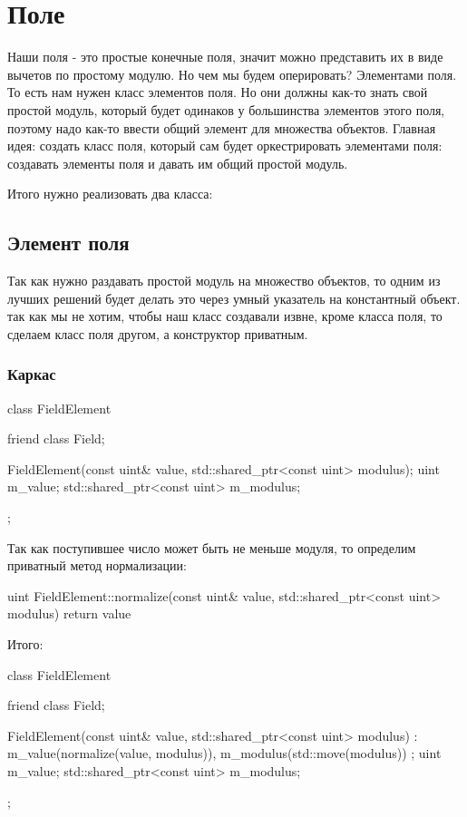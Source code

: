 
\section{Поле}
Наши поля - это простые конечные поля, значит можно представить их в виде вычетов по простому модулю. Но чем мы будем оперировать? Элементами поля. То есть нам нужен класс элементов поля. Но они должны как-то знать свой простой модуль, который будет одинаков у большинства элементов этого поля, поэтому надо как-то ввести общий элемент для множества объектов. Главная идея: создать класс поля, который сам будет оркестрировать элементами поля: создавать элементы поля и давать им общий простой модуль.

Итого нужно реализовать два класса:
\subsection{Элемент поля}
  Так как нужно раздавать простой модуль на множество объектов, то одним из лучших решений будет делать это через умный указатель на константный объект. так как мы не хотим, чтобы наш класс создавали извне, кроме класса поля, то сделаем класс поля другом, а конструктор приватным.
\subsubsection{Каркас}
  \begin{cppcode}
class FieldElement {
    friend class Field;

    FieldElement(const uint& value, std::shared_ptr<const uint> modulus);
    uint m_value;
    std::shared_ptr<const uint> m_modulus;
};
  \end{cppcode}
  Так как поступившее число может быть не меньше модуля, то определим приватный метод нормализации:
    \begin{cppcode}
uint FieldElement::normalize(const uint& value, std::shared_ptr<const uint> modulus) {
    return value %
}
  \end{cppcode}
  Итого:
  \begin{cppcode}
class FieldElement {
    friend class Field;

    FieldElement(const uint& value, std::shared_ptr<const uint> modulus) :
        m_value(normalize(value, modulus)), m_modulus(std::move(modulus)) {};
    uint m_value;
    std::shared_ptr<const uint> m_modulus;
};

  \end{cppcode}
